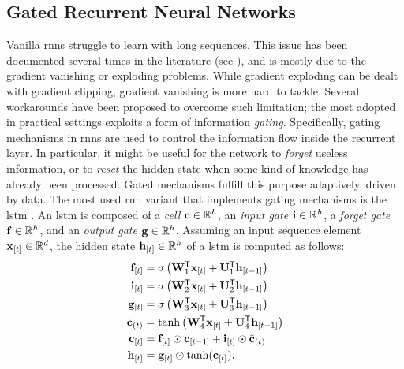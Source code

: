 \subsection{Gated Recurrent Neural Networks}
Vanilla \glspl{rnn} struggle to learn with long sequences. This issue has been documented several times in the literature (see \eg \citep{bengio1994learninglongtermdependenciesdifficult}), and is mostly due to the gradient vanishing or exploding problems. While gradient exploding can be dealt with gradient clipping, gradient vanishing is more hard to tackle. Several workarounds have been proposed to overcome such limitation; the most adopted in practical settings exploits a form of information \emph{gating}. Specifically, gating mechanisms in \glspl{rnn} are used to control the information flow inside the recurrent layer. In particular, it might be useful for the network to \emph{forget} useless information, or to \emph{reset} the hidden state when some kind of knowledge has already been processed. Gated mechanisms fulfill this purpose adaptively, driven by data. The most used \gls{rnn} variant that implements gating mechanisms is the \gls{lstm} \citep{hochreiter1997lstm}.
An \gls{lstm} is composed of a \emph{cell} $\Vector{c} \in \Real^h$, an \emph{input gate} $\Vector{i} \in \Real^h$, a \emph{forget gate} $\Vector{f} \in \Real^h$, and an \emph{output gate} $\Vector{g} \in \Real^h$. Assuming an input sequence element $\Elem{x}{t} \in \Real^d$, the hidden state $\Elem{h}{t} \in \Real^h$ of a \gls{lstm} is computed as follows:
\begin{align*}
    \Elem{f}{t} &= \sigma\Paren{\Matrix{W}_{1}^{\Transpose}\Elem{x}{t} + \Matrix{U}_{1}^{\Transpose}\Elem{h}{t-1}}\\
    \Elem{i}{t} &= \sigma\Paren{\Matrix{W}_{2}^{\Transpose}\Elem{x}{t} + \Matrix{U}_{2}^{\Transpose}\Elem{h}{t-1}}\\
    \Elem{g}{t} &= \sigma\Paren{\Matrix{W}_{3}^{\Transpose}\Elem{x}{t} + \Matrix{U}_{3}^{\Transpose}\Elem{h}{t-1}}\\
    \tilde{\Vector{c}}_{(t)} &= \Fun{tanh}\Paren{\Matrix{W}_{4}^{\Transpose}\Elem{x}{t} + \Matrix{U}_{4}^{\Transpose}\Elem{h}{t-1}}\\
    \Elem{c}{t} &= \Elem{f}{t} \odot \Elem{c}{t-1} + \Elem{i}{t} \odot \tilde{\Vector{c}}_{(t)}\\
    \Elem{h}{t} &= \Elem{g}{t} \odot \Fun{tanh}(\Elem{c}{t}),
\end{align*}
